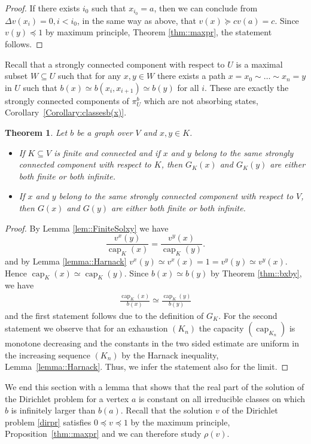 \documentclass[a4paper,oneside, 12pt]{amsart}
\newtheorem{theorem}{Theorem}
\numberwithin{theorem}{section}
\theoremstyle{definition}
\renewcommand{\c}{\operatorname{cap}}
\newcommand{\G}{{G}}
\newcommand{\prob}{\pi}
\begin{document}
{\begin{proof}
If there exists $i_0$ such that $x_{i_0}=a$, then we can conclude from  $\Delta v(x_i)=0, i< i_0$, in the same way as above, that $v(x)\succeq c v(a)=c$. Since $v(y)\preceq 1$ by maximum principle, Theorem \ref{thm::maxpr}, the statement follows.
\end{proof}

Recall that a strongly connected component with respect to $ U $ is a  maximal subset $W\subseteq U$  such that for any $x,y\in W$ 
there exists a path $
x=x_0\sim\dots \sim x_n=y
$ in $ U $ such that
$ b(x)\simeq b(x_i,x_{i+1})\simeq b(y) $ for all $ i $. These are exactly the strongly connected components of $ \prob_{U}^{b} $ which are not absorbing states, Corollary~\ref{Corollary:classesb(x)}.

\begin{theorem}\label{thm:Harnack}
Let $b$ be a  graph over $V$ and $ x,y\in K $.
\begin{itemize}
	\item [(a)] If $ K\subseteq  V $ is finite and connected and if $x$ and $y$ belong to the same strongly connected component with respect to $K$, then $\G_K(x)$ and $\G_K(y)$ are either both finite or both infinite. 
	\item [(b)] If $x$ and $y$ belong to the same strongly connected component with respect to $V$, then $\G(x)$ and $\G(y)$ are either both finite or both infinite. 
\end{itemize}
\end{theorem}
\begin{proof}
By Lemma \ref{lem::FiniteSolxy} we have
$$ 
\dfrac{v^x(y)}{\c_K(x)}=\dfrac{v^y(x)}{\c_K(y)}.
$$
and by Lemma \ref{lemma::Harnack} $v^x(y)\simeq v^x(x)=1=v^y(y) \simeq v^y(x)$.  Hence $\c_K(x)\simeq \c_K(y)$. Since $b(x)\simeq b(y)$ by Theorem \ref{thm::bxby}, 
we have 
\begin{align*}
	\frac{\c_K(x)}{b(x)}\simeq \frac{\c_K(y)}{b(y)}
\end{align*}
and the first statement follows due to the definition of $\G_K$. For the second statement we observe that for an exhaustion $(K_{n})  $ the capacity $( \c_{K_{n}}) $ is monotone decreasing and the constants in the two sided estimate are uniform in the increasing sequence $ (K_{n}) $ by the Harnack inequality, Lemma~\ref{lemma::Harnack}. Thus, we infer the statement also for the limit.
\end{proof}



We end this section with a lemma that shows that the real part of the solution of the Dirichlet problem  for a vertex $ a $ is constant on all irreducible classes on which $ b $ is infinitely larger than $ b(a)$. Recall that the solution $ v $ of the  Dirichlet problem \eqref{dirpr} satisfies $ 0\preceq v\preceq  1$ by the maximum principle, Proposition~\ref{thm::maxpr} and we can therefore study $ \rho(v) $.


}
\end{document}
